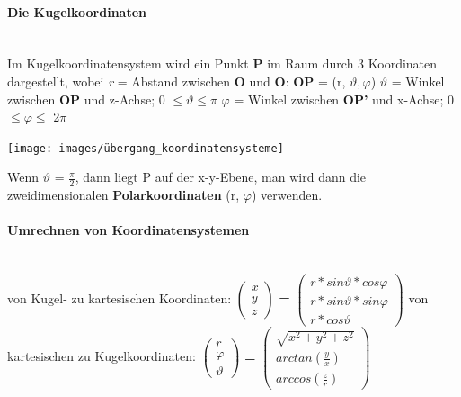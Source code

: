 \documentclass[7pt]{article}
\begin{document}
\begin{multicols}{3}
\paragraph{Die Kugelkoordinaten}

\mbox{}\\
Im Kugelkoordinatensystem wird ein Punkt \textbf{P} im Raum durch 3 Koordinaten dargestellt, wobei 
\newline \textit{r} = Abstand zwischen \textbf{O} und \textbf{O}: \textbf{OP} = (r, $\vartheta, \varphi$) 
\newline $\vartheta$ = Winkel zwischen \textbf{OP} und z-Achse; 0 $\leq \vartheta \leq \pi$
\newline $\varphi$ = Winkel zwischen \textbf{OP'} und x-Achse; 0 $\leq \varphi \leq$ 2$\pi$
\begin{center}
	\texttt{[image: images/übergang\_koordinatensysteme]}
\end{center}
Wenn $\vartheta$ = $\frac{\pi}{2}$, dann liegt P auf der x-y-Ebene, man wird dann die zweidimensionalen \textbf{Polarkoordinaten} (r, $\varphi$) verwenden.


\paragraph{Umrechnen von Koordinatensystemen}

\mbox{}\\von Kugel- zu kartesischen Koordinaten:
\newline 
$\begin{pmatrix} 
	x \\ y \\ z 
\end{pmatrix} $ 
\textbf{=}
$\begin{pmatrix}
	r*sin\vartheta*cos\varphi \\ r*sin\vartheta*sin\varphi \\ r*cos\vartheta
\end{pmatrix}$
\newline
\newline
\newline von kartesischen zu Kugelkoordinaten:
\newline $\begin{pmatrix} 
	r \\ \varphi \\ \vartheta 
\end{pmatrix} $ 
\textbf{=}
$\begin{pmatrix}
	\sqrt{x^{2}+ y^{2} + z^{2}} \\ arctan(\frac{y}{x}) \\ arccos(\frac{z}{r})
\end{pmatrix}$


\end{multicols}
\end{document}
